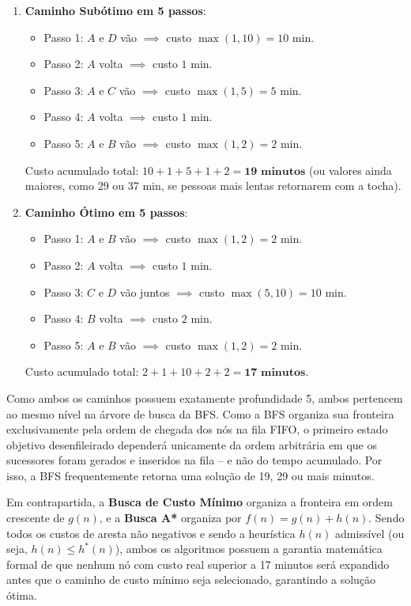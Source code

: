 \documentclass[12pt,a4paper]{article}
\begin{document}
\begin{enumerate}
    \item \textbf{Caminho Subótimo em 5 passos}:
    \begin{itemize}
        \item Passo 1: $A$ e $D$ vão $\implies$ custo $\max(1, 10) = 10\text{ min}$.
        \item Passo 2: $A$ volta $\implies$ custo $1\text{ min}$.
        \item Passo 3: $A$ e $C$ vão $\implies$ custo $\max(1, 5) = 5\text{ min}$.
        \item Passo 4: $A$ volta $\implies$ custo $1\text{ min}$.
        \item Passo 5: $A$ e $B$ vão $\implies$ custo $\max(1, 2) = 2\text{ min}$.
    \end{itemize}
    Custo acumulado total: $10 + 1 + 5 + 1 + 2 = \mathbf{19\text{ minutos}}$ (ou valores ainda maiores, como 29 ou 37 min, se pessoas mais lentas retornarem com a tocha).

    \item \textbf{Caminho Ótimo em 5 passos}:
    \begin{itemize}
        \item Passo 1: $A$ e $B$ vão $\implies$ custo $\max(1, 2) = 2\text{ min}$.
        \item Passo 2: $A$ volta $\implies$ custo $1\text{ min}$.
        \item Passo 3: $C$ e $D$ vão juntos $\implies$ custo $\max(5, 10) = 10\text{ min}$.
        \item Passo 4: $B$ volta $\implies$ custo $2\text{ min}$.
        \item Passo 5: $A$ e $B$ vão $\implies$ custo $\max(1, 2) = 2\text{ min}$.
    \end{itemize}
    Custo acumulado total: $2 + 1 + 10 + 2 + 2 = \mathbf{17\text{ minutos}}$.
\end{enumerate}

Como ambos os caminhos possuem exatamente profundidade 5, ambos pertencem ao mesmo nível na árvore de busca da BFS. Como a BFS organiza sua fronteira exclusivamente pela ordem de chegada dos nós na fila FIFO, o primeiro estado objetivo desenfileirado dependerá unicamente da ordem arbitrária em que os sucessores foram gerados e inseridos na fila -- e não do tempo acumulado. Por isso, a BFS frequentemente retorna uma solução de 19, 29 ou mais minutos.

Em contrapartida, a \textbf{Busca de Custo Mínimo} organiza a fronteira em ordem crescente de $g(n)$, e a \textbf{Busca A*} organiza por $f(n) = g(n) + h(n)$. Sendo todos os custos de aresta não negativos e sendo a heurística $h(n)$ admissível (ou seja, $h(n) \leq h^*(n)$), ambos os algoritmos possuem a garantia matemática formal de que nenhum nó com custo real superior a 17 minutos será expandido antes que o caminho de custo mínimo seja selecionado, garantindo a solução ótima.
\end{document}
